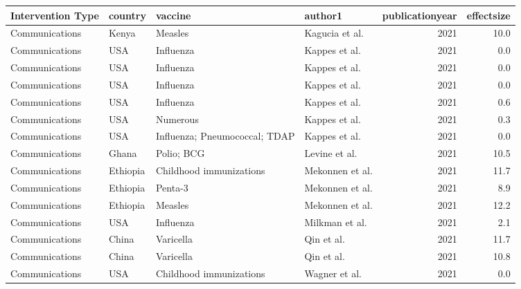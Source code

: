 
\begin{tabular}{llllrr}
\toprule
Intervention Type & country & vaccine & author1 & publicationyear & effectsize\\
\midrule
Communications & Kenya & Measles & Kagucia et al. & 2021 & 10.0\\
Communications & USA & Influenza & Kappes et al. & 2021 & 0.0\\
Communications & USA & Influenza & Kappes et al. & 2021 & 0.0\\
Communications & USA & Influenza & Kappes et al. & 2021 & 0.0\\
Communications & USA & Influenza & Kappes et al. & 2021 & 0.6\\
\addlinespace
Communications & USA & Numerous & Kappes et al. & 2021 & 0.3\\
Communications & USA & Influenza; Pneumococcal; TDAP & Kappes et al. & 2021 & 0.0\\
Communications & Ghana & Polio; BCG & Levine et al. & 2021 & 10.5\\
Communications & Ethiopia & Childhood immunizations & Mekonnen et al. & 2021 & 11.7\\
Communications & Ethiopia & Penta-3 & Mekonnen et al. & 2021 & 8.9\\
\addlinespace
Communications & Ethiopia & Measles & Mekonnen et al. & 2021 & 12.2\\
Communications & USA & Influenza & Milkman et al. & 2021 & 2.1\\
Communications & China & Varicella & Qin et al. & 2021 & 11.7\\
Communications & China & Varicella & Qin et al. & 2021 & 10.8\\
Communications & USA & Childhood immunizations & Wagner et al. & 2021 & 0.0\\
\bottomrule
\end{tabular}
